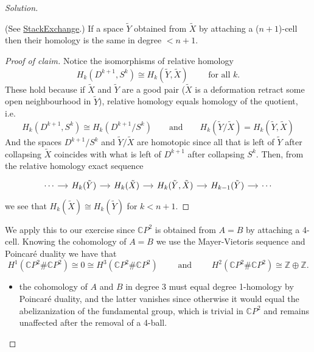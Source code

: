 \begin{proof}[Solution]
\begin{enumerate}[label=\alph*.]
				\begin{claim}\leavevmode
					(See \href{https://math.stackexchange.com/questions/4816763/intuition-for-killing-homology-group}{StackExchange}.) If a space $\tilde{Y}$ obtained from $\tilde{X}$ by attaching a ($n+1$)-cell then their homology is the same in degree $<n+1$.
				\end{claim} 
				\begin{proof}[Proof of claim]\leavevmode
					Notice the 
				isomorphisms of relative homology
				\[H_k(D^{k+1},S^k)\cong H_k(\tilde{Y},\tilde{X})\qquad \text{ for all $k$.} \]
				These hold because if  $\tilde{X}$ and $\tilde{Y}$ are a good pair ($\tilde{X}$ is a deformation retract some open neighbourhood in $\tilde{Y}$), relative homology equals homology of the quotient, i.e. \[H_k(D^{k+1},S^k)\cong H_k(D^{k+1}/S^k)\qquad \text{and}\qquad  H_k(\tilde{Y}/\tilde{X})=H_k(\tilde{Y},\tilde{X})\]
				And the spaces $D^{k+1}/S^k$ and  $\tilde{Y}/\tilde{X}$ are homotopic since all that is left of  $\tilde{Y}$ after collapsing $\tilde{X}$ coincides with what is left of $D^{k+1}$ after collapsing $S^k$. Then, from the relative homology exact sequence
\[\begin{tikzcd}[column sep=small]
	\cdots\arrow[r]&H_{k}(\tilde{Y})\arrow[r]&H_k(\tilde{X})\arrow[r]&H_k(\tilde{Y},\tilde{X})\arrow[r]&H_{k-1}(\tilde{Y})\arrow[r]&\cdots
\end{tikzcd}\]
				we see that $H_k(\tilde{X})\cong H_k(\tilde{Y})$ for $k<n+1$.
\end{proof}
				We apply this to our exercise since $\mathbb{C}P^{2}$ is obtained from $A=B$ by attaching a 4-cell. Knowing the cohomology of $A=B$ we use the Mayer-Vietoris sequence and Poincaré duality we have that
			\[H^{1}(\mathbb{C}P^{2}\#\mathbb{C}P^{2})\cong0\cong H^{3}(\mathbb{C}P^{2}\#\mathbb{C}P^{2})\qquad \text{ and } \qquad H^{2}(\mathbb{C}P^{2}\#\mathbb{C}P^{2})\cong\mathbb{Z}\oplus \mathbb{Z}.\]
				\iffalse

				\begin{itemize}
\item the cohomology of $A$ and $B$ in degree 3 must equal degree 1-homology by Poincaré duality, and the latter vanishes since otherwise it would equal the abelizanization of the fundamental group, which is trivial in $\mathbb{C}P^{2}$ and remains unaffected after the removal of a 4-ball.


\end{itemize}
\end{enumerate}
\end{proof}
